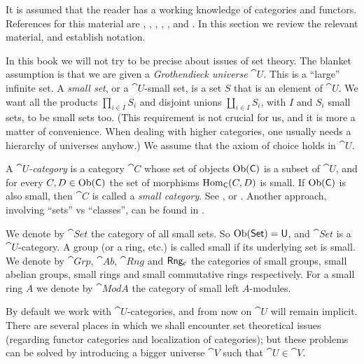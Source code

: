  
\renewcommand{\thisfile}{block1\_190328} 


\cleardoublepage
{} \label{sec:basic}
\AYcopyright

It is assumed that the reader has a working knowledge of categories and 
functors. References for this material are \cite{Mac1}, \cite{Mac2}, 
\cite{Rot}, \cite{HiSt}, \cite{We}, \cite{KaSc1} and \cite{KaSc2}. In this 
section we review the relevant material, and establish notation. 

 \label{subsec:set-theor}
In this book we will not try to be precise about issues of set theory. The
blanket assumption is that we are given a {\em Grothendieck universe}
$\cat{U}$. This is a ``large'' infinite set.
A {\em small set}, or a $\cat{U}$-small set, is a set $S$ that is an element of 
$\cat{U}$. We want all the products $\prod_{i \in I} S_i$ and disjoint unions 
$\coprod_{i \in I} S_i$, with $I$ and $S_i$ small sets, 
to be small sets too. 
(This requirement is not crucial for us, and it is more a matter of convenience.
When dealing with higher categories, one usually needs a hierarchy of 
universes anyhow.) We assume that the axiom of choice holds in $\cat{U}$. 

A {\em $\cat{U}$-category} is a category $\cat{C}$ whose
set of objects $\operatorname{Ob}(\operatorname{\mathsf{C}})$ is a subset of $\cat{U}$, 
and for every $C, D \in \operatorname{Ob}(\operatorname{\mathsf{C}})$ the set of morphisms 
$\operatorname{Hom}_{\operatorname{\mathsf{C}}}(C, D)$ is small. 
If $\operatorname{Ob}(\operatorname{\mathsf{C}})$ is also small, then $\cat{C}$ is called a {\em small 
category}. See \cite{SGA-4}, \cite{Mac2} or \cite[Section 1.1]{KaSc2}. Another 
approach, involving ``sets'' vs ``classes'',  can be found in \cite{Ne1}. 

We denote by $\cat{Set}$ the category of all small sets. So 
$\operatorname{Ob}(\operatorname{\mathsf{Set}}) = \operatorname{\mathsf{U}}$, and $\cat{Set}$ is a $\cat{U}$-category.
A group (or a ring, etc.) is called small if its underlying set is
small. We denote by $\cat{Grp}$, $\cat{Ab}$, $\cat{Rng}$ and 
$\operatorname{\mathsf{Rng_{\mathrm{c}}}}$ the categories of small groups, small abelian groups, 
small rings  and small commutative rings respectively.  
For a small ring $A$ we denote by $\cat{Mod} A$ the category of 
small left $A$-modules. 

By default we work with $\cat{U}$-categories, and from now on $\cat{U}$ will
remain implicit. There are several places in which we shall encounter 
set theoretical issues (regarding functor categories and localization of 
categories); but these problems can be solved by introducing a bigger universe
$\cat{V}$ such that $\cat{U} \in \cat{V}$.


